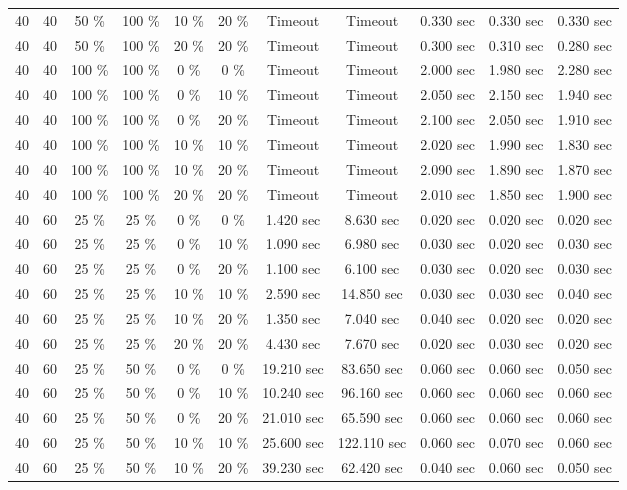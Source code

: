 \documentclass{article}
\begin{document}
\begin{longtable}[]{@{}ccccccccccc@{}}
40 & 40 & 50 \% & 100 \% & 10 \% & 20 \% & Timeout & Timeout & 0.330 sec & 0.330 sec & 0.330 sec \\
40 & 40 & 50 \% & 100 \% & 20 \% & 20 \% & Timeout & Timeout & 0.300 sec & 0.310 sec & 0.280 sec \\
40 & 40 & 100 \% & 100 \% & 0 \% & 0 \% & Timeout & Timeout & 2.000 sec & 1.980 sec & 2.280 sec \\
40 & 40 & 100 \% & 100 \% & 0 \% & 10 \% & Timeout & Timeout & 2.050 sec & 2.150 sec & 1.940 sec \\
40 & 40 & 100 \% & 100 \% & 0 \% & 20 \% & Timeout & Timeout & 2.100 sec & 2.050 sec & 1.910 sec \\
40 & 40 & 100 \% & 100 \% & 10 \% & 10 \% & Timeout & Timeout & 2.020 sec & 1.990 sec & 1.830 sec \\
40 & 40 & 100 \% & 100 \% & 10 \% & 20 \% & Timeout & Timeout & 2.090 sec & 1.890 sec & 1.870 sec \\
40 & 40 & 100 \% & 100 \% & 20 \% & 20 \% & Timeout & Timeout & 2.010 sec & 1.850 sec & 1.900 sec \\
40 & 60 & 25 \% & 25 \% & 0 \% & 0 \% & 1.420 sec & 8.630 sec & 0.020 sec & 0.020 sec & 0.020 sec \\
40 & 60 & 25 \% & 25 \% & 0 \% & 10 \% & 1.090 sec & 6.980 sec & 0.030 sec & 0.020 sec & 0.030 sec \\
40 & 60 & 25 \% & 25 \% & 0 \% & 20 \% & 1.100 sec & 6.100 sec & 0.030 sec & 0.020 sec & 0.030 sec \\
40 & 60 & 25 \% & 25 \% & 10 \% & 10 \% & 2.590 sec & 14.850 sec & 0.030 sec & 0.030 sec & 0.040 sec \\
40 & 60 & 25 \% & 25 \% & 10 \% & 20 \% & 1.350 sec & 7.040 sec & 0.040 sec & 0.020 sec & 0.020 sec \\
40 & 60 & 25 \% & 25 \% & 20 \% & 20 \% & 4.430 sec & 7.670 sec & 0.020 sec & 0.030 sec & 0.020 sec \\
40 & 60 & 25 \% & 50 \% & 0 \% & 0 \% & 19.210 sec & 83.650 sec & 0.060 sec & 0.060 sec & 0.050 sec \\
40 & 60 & 25 \% & 50 \% & 0 \% & 10 \% & 10.240 sec & 96.160 sec & 0.060 sec & 0.060 sec & 0.060 sec \\
40 & 60 & 25 \% & 50 \% & 0 \% & 20 \% & 21.010 sec & 65.590 sec & 0.060 sec & 0.060 sec & 0.060 sec \\
40 & 60 & 25 \% & 50 \% & 10 \% & 10 \% & 25.600 sec & 122.110 sec & 0.060 sec & 0.070 sec & 0.060 sec \\
40 & 60 & 25 \% & 50 \% & 10 \% & 20 \% & 39.230 sec & 62.420 sec & 0.040 sec & 0.060 sec & 0.050 sec \\

\end{longtable}
\end{document}
